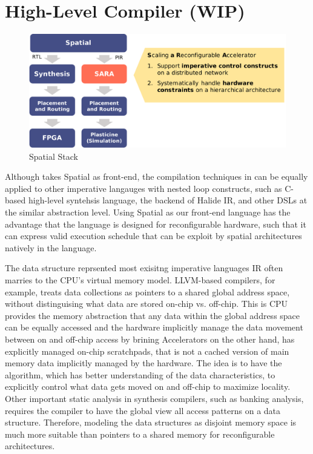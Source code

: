 \section{High-Level Compiler (WIP)} 

\begin{figure}
\centering
\includegraphics[width=1\textwidth]{figs/spatialstack.pdf}
\caption[Spatial Stack]{Spatial Stack}
\label{fig:spatialstack}
\end{figure}

Although \name takes Spatial as front-end, the compilation techniques in \name can be equally
applied to other imperative langauges with nested loop constructs, such as C-based high-level
syntehsis language, the backend of Halide IR, and other DSLs at the similar abstraction level. 
Using Spatial as our front-end language has the advantage that the language is designed for
reconfigurable hardware, such that it can express valid execution schedule that can be exploit by
spatial architectures natively in the language.

The data structure reprsented most exisitng imperative languages IR often marries to the
CPU's virtual memory model. LLVM-based compilers, for example, treats data collections as pointers to a shared
global address space, without distinguising what data are stored on-chip vs. off-chip.
This is CPU provides the memory abstraction that any data within the global address space 
can be equally accessed and the hardware implicitly manage the data movement between on and off-chip 
access by brining
Accelerators on the other hand, has explicitly managed on-chip scratchpads, that is not a cached
version of main memory data implicitly managed by the hardware.
The idea is to have the algorithm, which has better understanding of the data characteristics, to
explicitly control what data gets moved on and off-chip to maximize locality.
Other important static analysis in synthesis compilers, such as banking analysis, requires the
compiler to have the global view all access patterns on a data structure.
Therefore, modeling the data structures as disjoint memory space is much more suitable 
than pointers to a shared memory for reconfigurable architectures.

